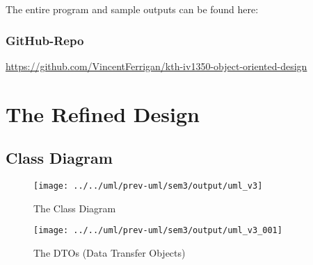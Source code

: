 \documentclass[a4paper]{scrreprt}
\begin{document}
The entire program and sample outputs can be found here:

\subsubsection*{GitHub-Repo}
\url{https://github.com/VincentFerrigan/kth-iv1350-object-oriented-design}

%
\newpage
    \section*{The Refined Design}
    \subsection*{Class Diagram}

    \begin{figure}[h!]
        \begin{center}
            \texttt{[image: ../../uml/prev-uml/sem3/output/uml\_v3]}
            \caption{The Class Diagram}
            \label{fig:CD}
        \end{center}
    \end{figure}

    \begin{figure}[h!]
        \begin{center}
            \texttt{[image: ../../uml/prev-uml/sem3/output/uml\_v3\_001]}
            \caption{The DTOs (Data Transfer Objects)}
            \label{fig:DTO}
        \end{center}
    \end{figure}
\end{document}
